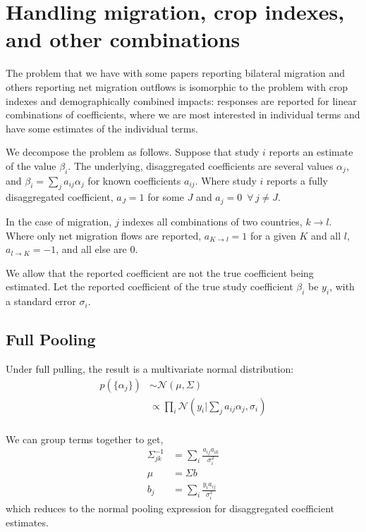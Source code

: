 \documentclass[12pt, oneside]{amsart}
\begin{document}
\section{Handling migration, crop indexes, and other combinations}

The problem that we have with some papers reporting bilateral
migration and others reporting net migration outflows is isomorphic to
the problem with crop indexes and demographically combined impacts:
responses are reported for linear combinations of coefficients, where
we are most interested in individual terms and have some estimates of
the individual terms.

We decompose the problem as follows.  Suppose that study $i$ reports
an estimate of the value $\beta_i$.  The underlying, disaggregated
coefficients are several values $\alpha_j$, and
$\beta_i = \sum_j a_{ij} \alpha_j$ for known coefficients $a_{ij}$.
Where study $i$ reports a fully disaggregated coefficient, $a_J = 1$
for some $J$ and $a_j = 0\,\,\,\forall\, j \ne J$.

In the case of migration, $j$ indexes all combinations of two
countries, $k \rightarrow l$.  Where only net migration flows are
reported, $a_{K \rightarrow l} = 1$ for a given $K$ and all $l$,
$a_{l \rightarrow K} = -1$, and all else are 0.

We allow that the reported coefficient are not the true coefficient
being estimated.  Let the reported coefficient of the true study
coefficient $\beta_i$ be $y_i$, with a standard error
$\sigma_i$.

\subsection{Full Pooling}

Under full pulling, the result is a multivariate normal distribution:
\begin{align*}
  p(\{\alpha_j\}) &\sim \mathcal{N}\left(\mu, \Sigma\right) \\
                  &\propto \prod_i \mathcal{N}\left(y_i | \sum_j a_{ij}
                    \alpha_j, \sigma_i\right) \\
\end{align*}

We can group terms together to get,
\begin{align*}
  \Sigma^{-1}_{jk} &= \sum_i \frac{a_{ij} a_{ik}}{\sigma_i^2} \\
  \mu &= \Sigma b \\
  b_j &= \sum_i \frac{y_i a_{ij}}{\sigma_i^2}
\end{align*}
which reduces to the normal pooling expression for disaggregated
coefficient estimates.
\end{document}
